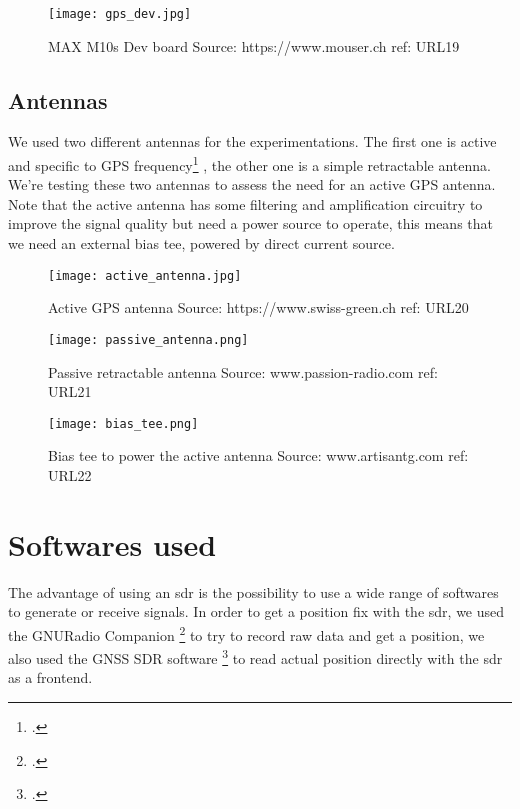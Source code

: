 \begin{figure}[H]
	\centering
	\texttt{[image: gps\_dev.jpg]}
	\caption[MAX M10s Dev board]{MAX M10s Dev board Source: https://www.mouser.ch ref: URL19}
	\label{fig:gps_dev}
\end{figure}

\subsection{Antennas}

We used two different antennas for the experimentations. The first one is active and specific to GPS frequency\footcite{noauthor_ant-gps-sh2-sma_nodate} , the other one is a simple retractable antenna. We're testing these two antennas to assess the need for an active GPS antenna. Note that the active antenna has some filtering and amplification circuitry to improve the signal quality but need a power source to operate, this means that we need an external bias tee, powered by direct current source.

\begin{figure}[H]
	\centering
	\texttt{[image: active\_antenna.jpg]}
	\caption[Active GPS antenna]{Active GPS antenna Source: https://www.swiss-green.ch ref: URL20}
	\label{fig:active_antenna}
\end{figure}

\begin{figure}[H]
	\centering
	\texttt{[image: passive\_antenna.png]}
	\caption[Passive retractable antenna]{Passive retractable antenna Source: www.passion-radio.com ref: URL21}
	\label{fig:passive_antenna}
\end{figure}

\begin{figure}[H]
	\centering
	\texttt{[image: bias\_tee.png]}
	\caption[Bias tee]{Bias tee to power the active antenna Source: www.artisantg.com ref: URL22}
	\label{fig:bias}
\end{figure}

\section{Softwares used}

The advantage of using an \gls{sdr} is the possibility to use a wide range of softwares to generate or receive signals.
In order to get a position fix with the \gls{sdr}, we used the GNURadio Companion \footcite{noauthor_gnu_nodate} to try to record raw data and get a position, we also used the GNSS SDR software \footcite{fernandez-prades_gnss-sdr_2024}  to read actual position directly with the \gls{sdr} as a frontend.

